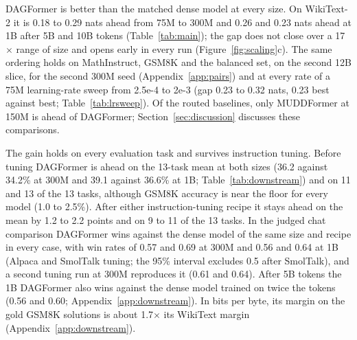 \documentclass[11pt]{article}
\newcommand{\dagf}{DAGFormer}
\begin{document}
\dagf{} is better than the matched dense model at every size. On WikiText-2 it is 0.18 to 0.29 nats ahead from 75M to 300M and 0.26 and 0.23 nats ahead at 1B after 5B and 10B tokens (Table~\ref{tab:main}); the gap does not close over a 17$\times$ range of size and opens early in every run (Figure~\ref{fig:scaling}c). The same ordering holds on MathInstruct, GSM8K and the balanced set, on the second 12B slice, for the second 300M seed (Appendix~\ref{app:pairs}) and at every rate of a 75M learning-rate sweep from 2.5e-4 to 2e-3 (gap 0.23 to 0.32 nats, 0.23 best against best; Table~\ref{tab:lrsweep}). Of the routed baselines, only MUDDFormer at 150M is ahead of \dagf{}; Section~\ref{sec:discussion} discusses these comparisons.

The gain holds on every evaluation task and survives instruction tuning. Before tuning \dagf{} is ahead on the 13-task mean at both sizes (36.2 against 34.2\% at 300M and 39.1 against 36.6\% at 1B; Table~\ref{tab:downstream}) and on 11 and 13 of the 13 tasks, although GSM8K accuracy is near the floor for every model (1.0 to 2.5\%). After either instruction-tuning recipe it stays ahead on the mean by 1.2 to 2.2 points and on 9 to 11 of the 13 tasks. In the judged chat comparison \dagf{} wins against the dense model of the same size and recipe in every case, with win rates of 0.57 and 0.69 at 300M and 0.56 and 0.64 at 1B (Alpaca and SmolTalk tuning; the 95\% interval excludes 0.5 after SmolTalk), and a second tuning run at 300M reproduces it (0.61 and 0.64). After 5B tokens the 1B \dagf{} also wins against the dense model trained on twice the tokens (0.56 and 0.60; Appendix~\ref{app:downstream}). In bits per byte, its margin on the gold GSM8K solutions is about 1.7$\times$ its WikiText margin (Appendix~\ref{app:downstream}).







\begin{table}[t]
\centering\fontsize{8.1pt}{9.8pt}\selectfont
\setlength{\tabcolsep}{1.4pt}

\caption{Evaluation tasks. Accuracy (\%) of the base models (base) and after instruction tuning on Alpaca-cleaned plus Dolly (+Alpaca) or SmolTalk (+SmolTalk), on twelve tasks, eleven multiple-choice and LAMBADA last-word prediction (normalized accuracy for ARC, HellaSwag, PIQA, OpenBookQA and MathQA, accuracy otherwise) and on GSM8K (3-shot exact match, first 200 problems); Mean: over the 13 tasks. Bold: better of the pair. 1B: after 10B tokens; the 1B models after 5B tokens, bits per byte and a second tuning seed are in Appendix~\ref{app:downstream}.}
\label{tab:downstream}
\end{table}
\end{document}
